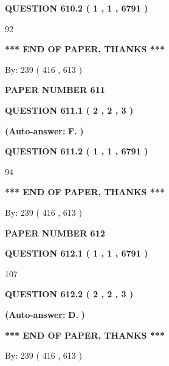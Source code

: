 \documentclass[12pt]{article}
\begin{document}
  
{\textbf{\large{QUESTION
610.2 
 ( 1 , 1 , 6791 )
}}}

92
   
   
   
   
\vspace{1.0in} 
{\textbf{\large{ *** END OF PAPER, THANKS *** }}} 
   
   
\hspace{1.0in} By: 
 239 ( 416 ,  613 )
   
   
   
   
\newpage 
\setcounter{page}{ 
   611001 } 
   
   
 {\textbf{ \Large{ PAPER NUMBER  611  }}}
   
   
   
   
  
  
{\textbf{\large{QUESTION
611.1 
 ( 2 , 2 , 3 )
}}}
 
 
{\textbf{(Auto-answer:}}
{\textbf{\large{
F.}}}
{\textbf{)}}
 
 
  
  
{\textbf{\large{QUESTION
611.2 
 ( 1 , 1 , 6791 )
}}}

94
   
   
   
   
\vspace{1.0in} 
{\textbf{\large{ *** END OF PAPER, THANKS *** }}} 
   
   
\hspace{1.0in} By: 
 239 ( 416 ,  613 )
   
   
   
   
\newpage 
\setcounter{page}{ 
   612001 } 
   
   
 {\textbf{ \Large{ PAPER NUMBER  612  }}}
   
   
   
   
  
  
{\textbf{\large{QUESTION
612.1 
 ( 1 , 1 , 6791 )
}}}

107
  
  
{\textbf{\large{QUESTION
612.2 
 ( 2 , 2 , 3 )
}}}
 
 
{\textbf{(Auto-answer:}}
{\textbf{\large{
D.}}}
{\textbf{)}}
 
 
   
   
   
   
\vspace{1.0in} 
{\textbf{\large{ *** END OF PAPER, THANKS *** }}} 
   
   
\hspace{1.0in} By: 
 239 ( 416 ,  613 )
   
   
   
\end{document}
